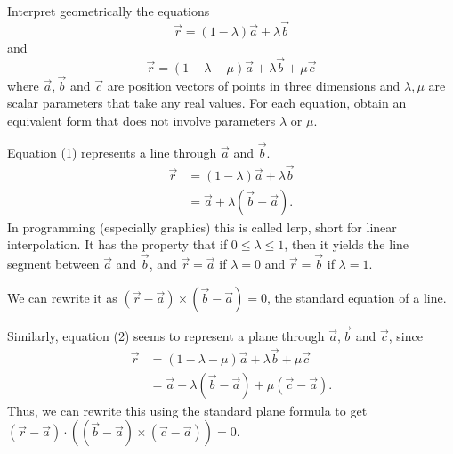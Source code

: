 \documentclass[12pt]{article}
\begin{document}
    \begin{question}
        Interpret geometrically the equations
        \begin{equation}
        \vec{r} = (1-\lambda)\vec{a}+\lambda\vec{b}
        \end{equation}
        and
        \begin{equation}
        \vec{r} = (1-\lambda-\mu)\vec{a}+\lambda\vec{b}+\mu\vec{c}
        \end{equation}
        where $\vec{a},\vec{b}$ and $\vec{c}$ are 
        position vectors of points in three dimensions
        and $\lambda,\mu$ are scalar parameters
        that take any real values.
        For each equation, obtain an equivalent
        form that does not involve parameters
        $\lambda$ or $\mu$.
    \end{question}
    \begin{answer}
        Equation (1) represents a line through $\vec{a}$ and $\vec{b}$.
        \begin{align*}
            \vec{r} 
            &= (1-\lambda)\vec{a}+\lambda\vec{b}\\
            &= \vec{a} + \lambda(\vec{b}-\vec{a}).
        \end{align*}
        In programming (especially graphics)
        this is called lerp, short for linear interpolation.
        It has the property that if $0\le\lambda\le1$,
        then it yields the line segment between $\vec{a}$ and $\vec{b}$,
        and $\vec{r}=\vec{a}$ if $\lambda=0$ and $\vec{r}=\vec{b}$ if $\lambda=1$.

        We can rewrite it as $(\vec{r}-\vec{a})\times(\vec{b}-\vec{a}) = 0$,
        the standard equation of a line.

        Similarly, equation (2) seems to represent
        a plane through $\vec{a},\vec{b}$ and $\vec{c}$, since
        \begin{align*}
            \vec{r} 
            &= (1-\lambda-\mu)\vec{a}+\lambda\vec{b}+\mu\vec{c}\\
            &= \vec{a} + \lambda(\vec{b}-\vec{a})+\mu(\vec{c}-\vec{a}).
        \end{align*}
        Thus, we can rewrite this using the standard plane formula
        to get $(\vec{r}-\vec{a})\cdot((\vec{b}-\vec{a})\times(\vec{c}-\vec{a}))=0$.


\end{answer}
\end{document}
